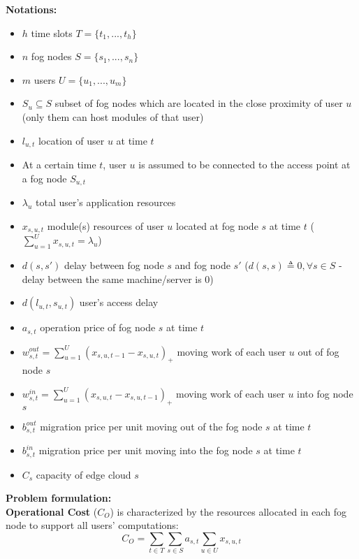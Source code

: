 \documentclass{article}
\begin{document}
\vspace{12pt}
\noindent\textbf{Notations:}\\[6pt]
\begin{itemize}
    \item $h$ time slots $T=\{t_1, ..., t_h\}$
    \item $n$ fog nodes $S=\{s_1, ..., s_n\}$
    \item $m$ users $U=\{u_1, ..., u_m\}$
    \item $S_u \subseteq S$ subset of fog nodes which are located in the close proximity of user $u$ (only them can host modules of that user)\\
    
    \item $l_{u,t}$ location of user $u$ at time $t$
    \item At a certain time $t$, user $u$ is assumed to be connected to the access point at a fog node $S_{u,t}$
    \item $\lambda_u$ total user's application resources
    \item $x_{s,u,t}$ module(s) resources of user $u$ located at fog node $s$ at time $t$ ($\sum_{u=1}^U x_{s,u,t} = \lambda_u$)
    \item $d(s, s')$ delay between fog node $s$ and fog node $s'$ ($d(s, s) \triangleq 0, \forall s \in S$ - delay between the same machine/server is 0)
    \item $d(l_{u,t}, s_{u,t})$ user's access delay
    \item $a_{s,t}$ operation price of fog node $s$ at time $t$
    \item $w^{out}_{s,t} = \sum_{u = 1}^U (x_{s,u,t-1} - x_{s,u,t})_+$ moving work of each user $u$ out of fog node $s$
    \item $w^{in}_{s,t} = \sum_{u = 1}^U (x_{s,u,t} - x_{s,u,t-1})_+$ moving work of each user $u$ into fog node $s$\\
    
    \item $b^{out}_{s,t}$ migration price per unit moving out of the fog node $s$ at time $t$
    \item $b^{in}_{s,t}$ migration price per unit moving into the fog node $s$ at time $t$
    \item $C_s$ capacity of edge cloud $s$
\end{itemize}

\vspace{12pt}
\noindent\textbf{Problem formulation:}\\[6pt]
\noindent\textbf{Operational Cost} ($C_O$) is characterized by the resources allocated in each fog node to support all users' computations:
\begin{equation}
    C_O = \sum_{t \in T} \sum_{s \in S} a_{s,t} \sum_{u \in U} x_{s,u,t}
\end{equation}
\end{document}

